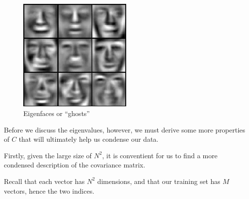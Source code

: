 \documentclass[12pt]{report}
\begin{document}
            \begin{figure}[H]
                \centering
                \includegraphics[width=0.5\textwidth]{eigenfaces.jpg}
                \caption{Eigenfaces or ``ghosts'' \cite{Dusenberry2015}}
            \end{figure}

            Before we discuss the eigenvalues, however, we must derive some more properties of $C$ that will ultimately help us condense our data.

            Firstly, given the large size of $N^2$, it is conventient for us to find a more condensed description of the covariance matrix.


            Recall that each vector has $N^2$ dimensions, and that our training set has $M$ vectors, hence the two indices. 
\end{document}
